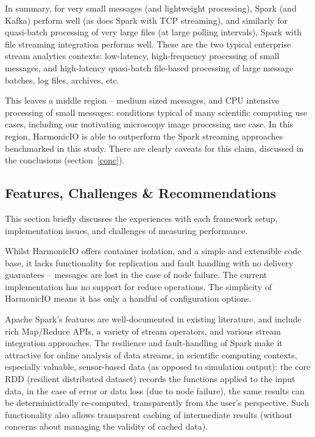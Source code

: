 \documentclass[conference]{IEEEtran}
\begin{document}
In summary, for very small messages (and lightweight processing), Spark (and Kafka) perform well (as does Spark with TCP streaming), and similarly for quasi-batch processing of very large files (at large polling intervals), Spark with file streaming integration performs well. These are the two typical enterprise stream analytics contexts: low-latency, high-frequency processing of small messages, and high-latency quasi-batch file-based processing of large message batches, log files, archives, etc.

This leaves a middle region -- medium sized messages, and CPU intensive processing of small messages: conditions typical of many scientific computing use cases, including our motivating microscopy image processing use case. In this region, HarmonicIO is able to outperform the Spark streaming approaches benchmarked in this study. There are clearly caveats for this claim, discussed in the conclusions (section~\ref{conc}).




\subsection{Features, Challenges \& Recommendations}\label{challenges}

This section briefly discusses the experiences with each framework setup, 
implementation issues, and challenges of measuring performance.


Whilst HarmonicIO offers container isolation, and a simple and extensible code base, it lacks functionality for replication and fault handling with no delivery guarantees -- messages are lost in the case of node failure. The current implementation has no support for reduce operations. The simplicity of HarmonicIO means it has only a handful of configuration options.

Apache Spark's features are well-documented in existing literature, and include rich Map/Reduce APIs, a variety of stream operators, and various stream integration approaches. The resilience and fault-handling of Spark make it attractive for online analysis of data streams, in scientific computing contexts, especially valuable, sensor-based data (as opposed to simulation output): the core RDD (resilient distributed dataset) records the functions applied to the input data, in the case of error or data loss (due to node failure), the same results can be deterministically re-computed, transparently from the user's perspective. Such functionality also allows transparent caching of intermediate results (without concerns about managing the validity of cached data).
\end{document}
